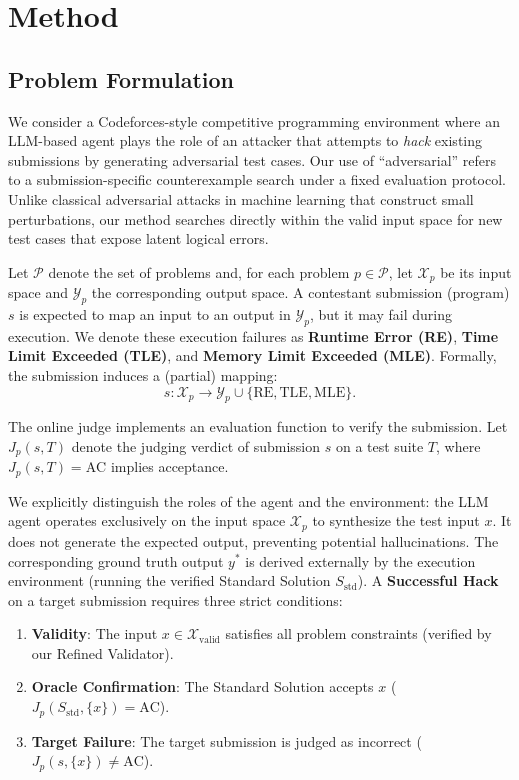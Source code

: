 \documentclass[11pt]{article}
\begin{document}
\section{Method}
\subsection{Problem Formulation}
\label{sec:problem-formulation}

We consider a Codeforces-style competitive programming environment where an LLM-based agent plays the role of an attacker that attempts to \emph{hack} existing submissions by generating adversarial test cases. {Our use of ``adversarial'' refers to a submission-specific counterexample search under a fixed evaluation protocol. Unlike classical adversarial attacks in machine learning that construct small perturbations, our method searches directly within the valid input space for new test cases that expose latent logical errors.}

Let $\mathcal{P}$ denote the set of problems and, for each problem $p \in \mathcal{P}$, let $\mathcal{X}_p$ be its input space and $\mathcal{Y}_p$ the corresponding output space. 
A contestant submission (program) $s$ is expected to map an input to an output in $\mathcal{Y}_p$, but it may fail during execution. We denote these execution failures as \textbf{Runtime Error (RE)}, \textbf{Time Limit Exceeded (TLE)}, and \textbf{Memory Limit Exceeded (MLE)}. Formally, the submission induces a (partial) mapping:
\[
s : \mathcal{X}_p \to \mathcal{Y}_p \cup \{\text{RE}, \text{TLE}, \text{MLE}\}.
\]

The online judge implements an evaluation function to verify the submission. {Let $J_p(s, T)$ denote the judging verdict of submission $s$ on a test suite $T$, where $J_p(s, T) = \text{AC}$ implies acceptance.}

{We explicitly distinguish the roles of the agent and the environment: the LLM agent operates exclusively on the input space $\mathcal{X}_p$ to synthesize the test input $x$. It does not generate the expected output, preventing potential hallucinations. The corresponding ground truth output $y^*$ is derived externally by the execution environment (running the verified Standard Solution $S_{\text{std}}$). A \textbf{Successful Hack} on a target submission requires three strict conditions:}
\begin{enumerate}
    \item {\textbf{Validity}: The input $x \in \mathcal{X}_{\text{valid}}$ satisfies all problem constraints (verified by our Refined Validator).}
    \item {\textbf{Oracle Confirmation}: The Standard Solution accepts $x$ ($J_p(S_{\text{std}}, \{x\}) = \text{AC}$).}
    \item {\textbf{Target Failure}: The target submission is judged as incorrect ($J_p(s, \{x\}) \neq \text{AC}$).}
\end{enumerate}
\end{document}
